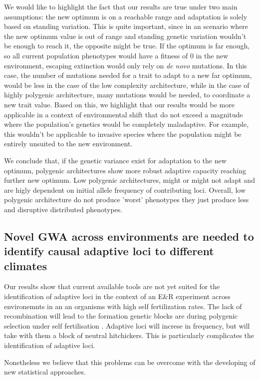 \documentclass{article}
\begin{document}
We would like to highlight the fact that our results are true under two main assumptions: the new optimum is on a reachable range and adaptation is solely based on standing variation. This is quite important, since in an scenario where the new optimum value is out of range and standing genetic variation wouldn't be enough to reach it, the opposite might be true. If the optimum is far enough, so all current population phenotypes would have a fitness of 0 in the new environment, escaping extinction would only rely on \textit{de novo} mutations. In this case, the number of mutations needed for a trait to adapt to a new far optimum, would be less in the case of the low complexity architecture, while in the case of highly polygenic architecture, many mutations would be needed, to coordinate a new trait value. Based on this, we highlight that our results would be more applicable in a context of environmental shift that do not exceed a magnitude where the population's genetics would be completely maladaptive. For example, this wouldn't be applicable to invasive species where the population might be entirely unsuited to the new environment. 

We conclude that, if the genetic variance exist for adaptation to the new optimum, polygenic architectures show more robust adaptive capacity reaching further new optimum. Low polygenic architectures, might or might not adapt and are higly dependent on initial allele frequency of contributing loci. Overall, low polygenic architecture do not produce 'worst' phenotypes they just produce less and disruptive distributed phenotypes. 

\subsection{Novel GWA across environments are needed to identify causal adaptive loci to different climates}

Our results show that current available tools are not yet suited for the identification of adaptive loci in the context of an E\&R experiment across environemnts in an an organisms with high self fertilization rates. 
The lack of recombination will lead to the formation genetic blocks are during polygenic selection under self fertilisation \citep{Hartfield2022-nc}. Adaptive loci will increse in frequency, but will take with them a block of neutral hitchickers. This is particularly complicates the identification of adaptive loci. 

Nonetheless we believe that this problems can be overcome with the developing of new statistical approaches. 
\end{document}
